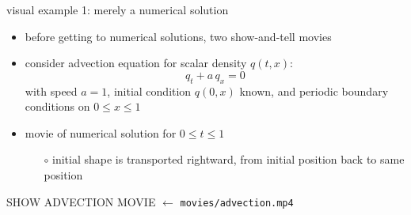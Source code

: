 \documentclass[10pt,dvipsnames,usepdftitle=false,
hyperref={pdftitle = {Finite volume methods},
    pdfauthor = {Ed Bueler}}]{beamer}
\begin{document}
\begin{frame}{visual example 1: merely a numerical solution}

\begin{itemize}
\item before getting to numerical solutions, two show-and-tell movies
\item consider advection equation for scalar density $q(t,x)$:
    $$q_t + a \, q_x = 0$$
with speed $a=1$, initial condition $q(0,x)$ known, and periodic boundary conditions on $0\le x \le 1$
\item movie of numerical solution for $0\le t \le 1$
    \begin{itemize}
    \item[$\circ$] initial shape is transported rightward, from initial position back to same position
    \end{itemize}
\end{itemize}

\vspace{10mm}
\begin{center}
\alert{SHOW ADVECTION MOVIE}  \qquad $\leftarrow$ \texttt{movies/advection.mp4}
\end{center}
\vspace{10mm}

\end{frame}
\end{document}
